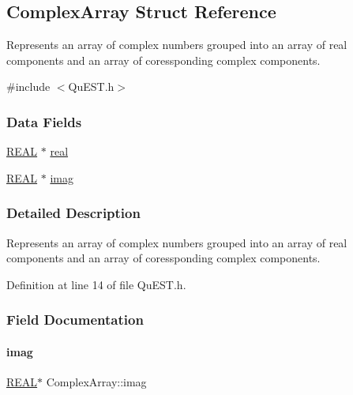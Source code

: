 \hypertarget{structComplexArray}{}\subsection{Complex\+Array Struct Reference}
\label{structComplexArray}


Represents an array of complex numbers grouped into an array of real components and an array of coressponding complex components.  




{\ttfamily \#include $<$Qu\+E\+S\+T.\+h$>$}

\subsubsection*{Data Fields}
\begin{DoxyCompactItemize}
\item 
\mbox{\hyperlink{QuEST__precision_8h_a4b654506f18b8bfd61ad2a29a7e38c25}{R\+E\+AL}} $\ast$ \mbox{\hyperlink{structComplexArray_a4195cac6c784ea1b6271f1c7dba1548a}{real}}
\item 
\mbox{\hyperlink{QuEST__precision_8h_a4b654506f18b8bfd61ad2a29a7e38c25}{R\+E\+AL}} $\ast$ \mbox{\hyperlink{structComplexArray_a79dde47c7ae530c79cebfdf57b225968}{imag}}
\end{DoxyCompactItemize}


\subsubsection{Detailed Description}
Represents an array of complex numbers grouped into an array of real components and an array of coressponding complex components. 

Definition at line 14 of file Qu\+E\+S\+T.\+h.



\subsubsection{Field Documentation}
\mbox{\label{structComplexArray_a79dde47c7ae530c79cebfdf57b225968}} 
\paragraph{\texorpdfstring{imag}{imag}}
{\footnotesize\ttfamily \mbox{\hyperlink{QuEST__precision_8h_a4b654506f18b8bfd61ad2a29a7e38c25}{R\+E\+AL}}$\ast$ Complex\+Array\+::imag}



